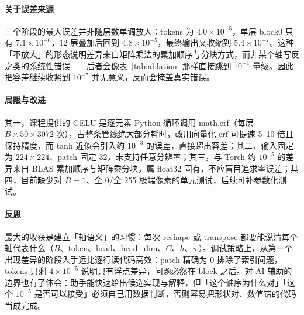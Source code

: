 \documentclass[a4paper,12pt]{article}
\begin{document}
\paragraph{关于误差来源}
三个阶段的最大误差并非随层数单调放大：tokens 为 $4.0\times10^{-5}$，单层 block0 只有 $7.1\times10^{-6}$，12 层叠加后回到 $4.8\times10^{-5}$，最终输出又收缩到 $5.4\times10^{-7}$。这种「不放大」的形态说明差异来自矩阵乘法的累加顺序与分块方式，而非某个轴写反之类的系统性错误——后者会像表~\ref{tab:ablation} 那样直接跳到 $10^{-1}$ 量级。因此把容差继续收紧到 $10^{-7}$ 并无意义，反而会掩盖真实错误。

\paragraph{局限与改进}
其一，课程提供的 GELU 是逐元素 Python 循环调用 math.erf（每层 $B\times50\times3072$ 次），占整条管线绝大部分耗时，改用向量化 erf 可提速 5--10 倍且保持精度，而 tanh 近似会引入约 $10^{-3}$ 的误差，直接超出容差；其二，输入固定为 $224\times224$、patch 固定 32，未支持任意分辨率；其三，与 Torch 约 $10^{-5}$ 的差异来自 BLAS 累加顺序与矩阵乘分块，属 float32 固有，不应盲目追求零误差；其四，目前缺少对 $B=1$、全 0/全 255 极端像素的单元测试，后续可补参数化测试。

\paragraph{反思}
最大的收获是建立「轴语义」的习惯：每次 reshape 或 transpose 都要能说清每个轴代表什么（$B$、token、head、head\_dim、$C$、$h$、$w$）。调试策略上，从第一个出现差异的阶段入手远比逐行读代码高效：patch 精确为 0 排除了索引问题，tokens 只剩 $4\times10^{-5}$ 说明只有浮点差异，问题必然在 block 之后。对 AI 辅助的边界也有了体会：助手能快速给出候选实现与解释，但「这个轴序为什么对」「这个 $10^{-5}$ 是否可以接受」必须自己用数据判断，否则容易把形状对、数值错的代码当成完成。

\newpage



\vspace{1cm}
\end{document}
